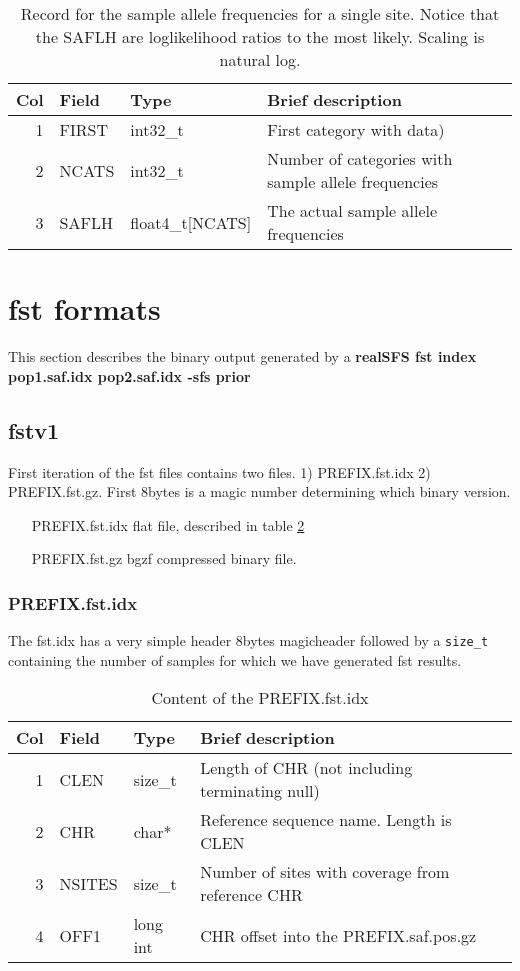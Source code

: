 \documentclass[10pt]{article}
\begin{document}
\begin{table}[h]
\begin{tabular}{rllll}
  \hline
  {\bf Col} & {\bf Field} & {\bf Type} & {\bf Brief description} \\
  \hline
  1 & {\sf FIRST} & int32\_t  &  First category with data)\\
  2 & {\sf NCATS} & int32\_t & Number of categories with sample allele frequencies\\
  3 & {\sf SAFLH} & float4\_t[NCATS] & The actual sample allele frequencies\\
  \hline
\end{tabular}
\caption{Record for the sample allele frequencies for a single site. Notice that the SAFLH are loglikelihood ratios to the most likely. Scaling is natural log.}
\label{tab3}
\end{table}

\clearpage
\section{fst formats}
This section describes the binary output generated by a \textbf{realSFS fst index pop1.saf.idx pop2.saf.idx -sfs prior}
\subsection{fstv1}

First iteration of the fst files contains two files. 1) PREFIX.fst.idx 2) PREFIX.fst.gz.
First 8bytes is a magic number determining which binary version.


\begin{itemize}
\item[PREFIX.fst.idx] flat file, described in table \ref{tab2}
\item[PREFIX.fst.gz] bgzf compressed binary file.
\end{itemize}
\subsubsection{PREFIX.fst.idx}
The fst.idx has a very simple header 8bytes magicheader followed by a \texttt{size\_t} containing the number of samples for which we have generated fst results.
\begin{table}[h]
\begin{tabular}{rllll}
  \hline
  {\bf Col} & {\bf Field} & {\bf Type} & {\bf Brief description} \\
  \hline
  1 & {\sf CLEN} & size\_t &  Length of CHR (not including terminating null)\\
  2 & {\sf CHR} & char* & Reference sequence name. Length is CLEN\\
  3 & {\sf NSITES} & size\_t & Number of sites with coverage from reference CHR\\
  4 & {\sf OFF1} & long int & CHR offset into the PREFIX.saf.pos.gz \\
  \hline
\end{tabular}\label{tab2}
\caption{Content of the PREFIX.fst.idx}
\end{table}
\end{document}
